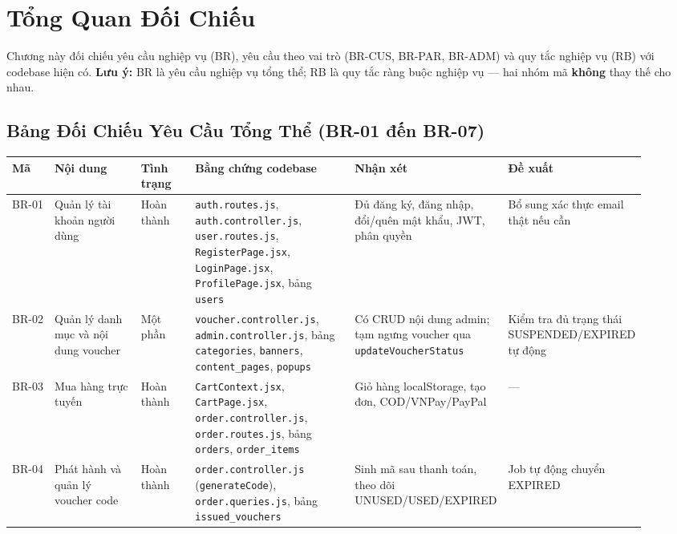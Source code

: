 \section{Tổng Quan Đối Chiếu}
Chương này đối chiếu yêu cầu nghiệp vụ (BR), yêu cầu theo vai trò (BR-CUS, BR-PAR, BR-ADM) và quy tắc nghiệp vụ (RB) với codebase hiện có. \textbf{Lưu ý:} BR là yêu cầu nghiệp vụ tổng thể; RB là quy tắc ràng buộc nghiệp vụ — hai nhóm mã \textbf{không} thay thế cho nhau.

\small
\subsection{Bảng Đối Chiếu Yêu Cầu Tổng Thể (BR-01 đến BR-07)}
\begin{longtable}{>{\raggedright\arraybackslash}p{0.08\linewidth}>{\raggedright\arraybackslash}p{0.18\linewidth}>{\raggedright\arraybackslash}p{0.10\linewidth}>{\raggedright\arraybackslash}p{0.28\linewidth}>{\raggedright\arraybackslash}p{0.14\linewidth}>{\raggedright\arraybackslash}p{0.14\linewidth}}
\toprule
\textbf{Mã} & \textbf{Nội dung} & \textbf{Tình trạng} & \textbf{Bằng chứng codebase} & \textbf{Nhận xét} & \textbf{Đề xuất}\\
\midrule
\endhead
BR-01 & Quản lý tài khoản người dùng & Hoàn thành & \texttt{auth.routes.js}, \texttt{auth.controller.js}, \texttt{user.routes.js}, \texttt{RegisterPage.jsx}, \texttt{LoginPage.jsx}, \texttt{ProfilePage.jsx}, bảng \texttt{users} & Đủ đăng ký, đăng nhập, đổi/quên mật khẩu, JWT, phân quyền & Bổ sung xác thực email thật nếu cần\\
BR-02 & Quản lý danh mục và nội dung voucher & Một phần & \texttt{voucher.controller.js}, \texttt{admin.controller.js}, bảng \texttt{categories}, \texttt{banners}, \texttt{content\_pages}, \texttt{popups} & Có CRUD nội dung admin; tạm ngưng voucher qua \texttt{updateVoucherStatus} & Kiểm tra đủ trạng thái SUSPENDED/EXPIRED tự động\\
BR-03 & Mua hàng trực tuyến & Hoàn thành & \texttt{CartContext.jsx}, \texttt{CartPage.jsx}, \texttt{order.controller.js}, \texttt{order.routes.js}, bảng \texttt{orders}, \texttt{order\_items} & Giỏ hàng localStorage, tạo đơn, COD/VNPay/PayPal & —\\
BR-04 & Phát hành và quản lý voucher code & Hoàn thành & \texttt{order.controller.js} (\texttt{generateCode}), \texttt{order.queries.js}, bảng \texttt{issued\_vouchers} & Sinh mã sau thanh toán, theo dõi UNUSED/USED/EXPIRED & Job tự động chuyển EXPIRED\\

\end{longtable}
